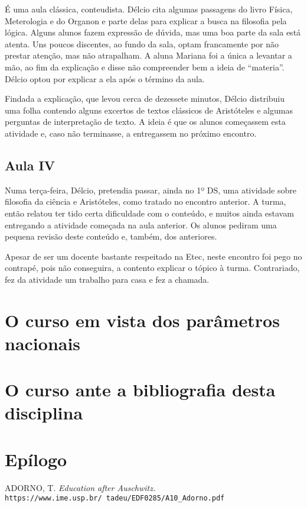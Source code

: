 \documentclass[12pt,a4paper]{article}
\begin{document}
    É uma aula clássica, conteudista. Délcio cita algumas passagens do livro 
    Física, Meterologia e do Organon e parte delas para explicar a busca na 
    filosofia pela lógica. Alguns alunos fazem expressão de dúvida, mas uma boa 
    parte da sala está atenta. Uns poucos discentes, ao fundo da sala, 
    optam francamente por não prestar atenção, mas não atrapalham. A aluna 
    Mariana foi a única a levantar a mão, ao fim da explicação e disse não 
    compreender bem a ideia de ``materia''. Délcio optou por explicar a ela 
    após o término da aula. 
    
    Findada a explicação, que levou cerca de dezessete minutos, Délcio 
    distribuiu uma folha contendo alguns excertos de textos clássicos de 
    Aristóteles e algumas perguntas de interpretação de texto. A ideia é que 
    os alunos começassem esta atividade e, caso não terminasse, a entregassem 
    no próximo encontro. 
    
    \subsection*{Aula IV}

	Numa terça-feira, Délcio, pretendia passar, ainda no 1º DS, uma atividade 
	sobre filosofia da ciência e Aristóteles, como tratado no encontro 
	anterior. A turma, então relatou ter tido certa dificuldade com o conteúdo, 
	e muitos ainda estavam entregando a atividade começada na aula anterior. 
	Os alunos pediram uma pequena revisão deste conteúdo e, também, dos 
	anteriores.  
	
	Apesar de ser um docente bastante respeitado na Etec, neste encontro foi 
	pego no contrapé, pois não conseguira, a contento explicar o tópico à 
	turma. Contrariado, fez da atividade um trabalho para casa e fez a chamada. 
	
	\newpage
		
	\section{O curso em vista dos parâmetros nacionais}
	
    
	
	\newpage
	
	\section{O curso ante a bibliografia desta disciplina}
	

	
	
	\newpage
	
	\section{Epílogo}
	
    
	
	\newpage
	

	
	\newpage
	
	\begin{thebibliography}{9}
		ADORNO, T. 
		\textit{Education after Auschwitz. }   
		\\\texttt{https://www.ime.usp.br/~tadeu/EDF0285/A10\_Adorno.pdf}
		
		
	\end{thebibliography}
\end{document}
